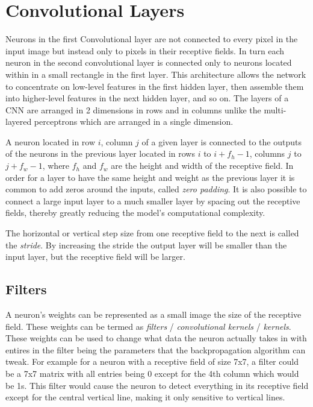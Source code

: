 \documentclass[12pt letter]{report}
\begin{document}
\section{Convolutional Layers}\label{convolutional-layers}

Neurons in the first Convolutional layer are not connected to every
pixel in the input image but instead only to pixels in their receptive
fields. In turn each neuron in the second convolutional layer is
connected only to neurons located within in a small rectangle in the
first layer. This architecture allows the network to concentrate on
low-level features in the first hidden layer, then assemble them into
higher-level features in the next hidden layer, and so on. The layers of
a CNN are arranged in 2 dimensions in rows and in columns unlike the
multi-layered perceptrons which are arranged in a single dimension.

A neuron located in row \(i\), column \(j\) of a given layer is
connected to the outputs of the neurons in the previous layer located in
rows \(i\) to \(i + f_h - 1\), columns \(j\) to \(j + f_w - 1\), where
\(f_h\) and \(f_w\) are the height and width of the receptive field. In
order for a layer to have the same height and weight as the previous
layer it is common to add zeros around the inputs, called \emph{zero
padding}. It is also possible to connect a large input layer to a much
smaller layer by spacing out the receptive fields, thereby greatly
reducing the model's computational complexity.

The horizontal or vertical step size from one receptive field to the
next is called the \emph{stride}. By increasing the stride the output
layer will be smaller than the input layer, but the receptive field will
be larger.

\subsection{Filters}\label{filters}

A neuron's weights can be represented as a small image the size of the
receptive field. These weights can be termed as \emph{filters} /
\emph{convolutional kernels} / \emph{kernels}. These weights can be used
to change what data the neuron actually takes in with entires in the
filter being the parameters that the backpropagation algorithm can
tweak. For example for a neuron with a receptive field of size 7x7, a
filter could be a 7x7 matrix with all entries being 0 except for the 4th
column which would be 1s. This filter would cause the neuron to detect
everything in its receptive field except for the central vertical line,
making it only sensitive to vertical lines.
\end{document}

